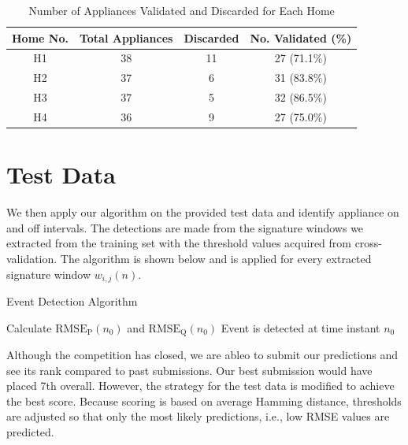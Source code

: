 \documentclass[conference]{IEEEtran}
\begin{document}
\begin{table}[!t]
	\renewcommand{\arraystretch}{1.3}
	\caption{Number of Appliances Validated and Discarded for Each Home}\label{classes}
	\label{table:cv}
	\centering
	\begin{tabular}{c||c||c||c}
		\hline 
		\textbf{Home No.} & \textbf{Total Appliances} &\textbf{Discarded} &\textbf{No. Validated (\%)}\tabularnewline
		\hline 
		\hline 
		H1 & 38 & 11 & 27 (71.1\%)\tabularnewline
		\hline 
		H2 & 37 & 6 & 31 (83.8\%)\tabularnewline
		\hline 
		H3 & 37 & 5 & 32 (86.5\%)\tabularnewline
		\hline 
		H4 & 36 & 9 & 27 (75.0\%)\tabularnewline
		\hline 
	\end{tabular}
\end{table}


\section{Test Data}\label{sec:test}
We then apply our algorithm on the provided test data and identify appliance on and off intervals.  The detections are made from the signature windows we extracted from the training set with the threshold values acquired from cross-validation.  The algorithm is shown below and is applied for every extracted signature window $w_{i,j}(n)$.

\begin{algorithm}
	\caption{Event Detection Algorithm}\label{euclid}
	\begin{algorithmic}[1]
			\State Calculate $\text{RMSE}_{\text{P}}(n_0)$ and $\text{RMSE}_{\text{Q}}(n_0)$
			\State Event is detected at time instant $n_0$
			\EndIf
	\EndFor
	\end{algorithmic}
\end{algorithm}

Although the competition has closed, we are ableo to submit our predictions and see its rank compared to past submissions. Our best submission would have placed 7th overall.  However, the strategy for the test data is modified to achieve the best score.  Because scoring is based on average Hamming distance, thresholds are adjusted so that only the most likely predictions, i.e., low RMSE values are predicted.  
\end{document}
